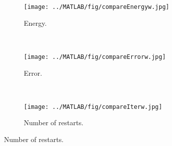 \begin{figure}[H]
        \centering
        
		\begin{subfigure}[b]{0.3\textwidth}
                \texttt{[image: ../MATLAB/fig/compareEnergyw.jpg]}
                \caption{ Energy. }
                \label{fig:compareEnergyw}
        \end{subfigure}
        ~
        \begin{subfigure}[b]{0.3\textwidth}
                \texttt{[image: ../MATLAB/fig/compareErrorw.jpg]}
                \caption{ Error. }
                \label{fig:compareErrorw}
        \end{subfigure}
        ~
        \begin{subfigure}[b]{0.3\textwidth}
                \texttt{[image: ../MATLAB/fig/compareIterw.jpg]}
                \caption{ Number of restarts.  }
                \label{fig:compareIterw}
        \end{subfigure}
        

\end{figure}
